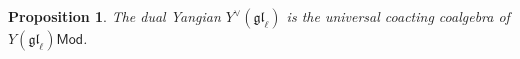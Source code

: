 \documentclass[11pt]{report}
\newtheorem{prop}[theorem]{Proposition}
\theoremstyle{definition}
\theoremstyle{remark}
\theoremstyle{remark}
\newcommand{\C}{\mathbb{C}}
\begin{document}
\begin{prop}
The dual Yangian $Y^\vee(\mathfrak{gl}_\ell)$ is the universal coacting coalgebra of $Y(\mathfrak{gl}_\ell)\mathsf{Mod}$.
\end{prop}

%
%
\end{document}
